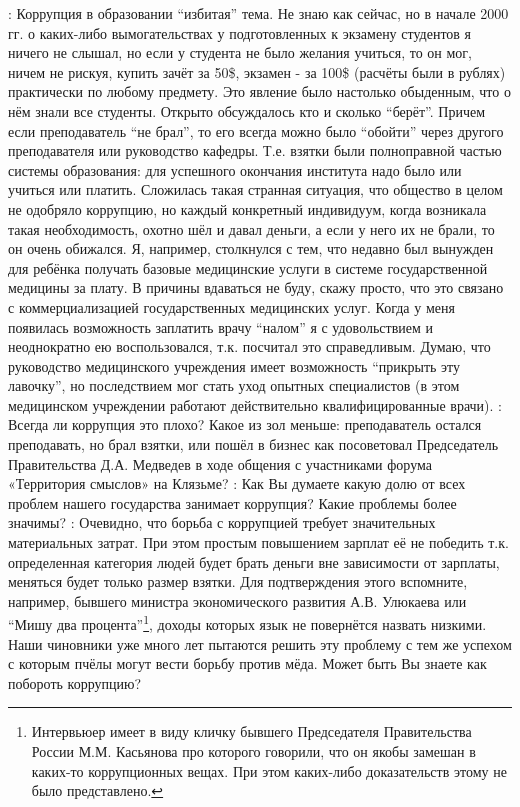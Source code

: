 \begin{drama}
	\maxspeaks: Коррупция в образовании “избитая” тема. Не знаю как сейчас, но в начале 2000 гг. о каких-либо вымогательствах у подготовленных к экзамену студентов я ничего не слышал, но если у студента не было желания учиться, то он мог, ничем не рискуя, купить зачёт за 50\$, экзамен - за 100\$ (расчёты были в рублях) практически по любому предмету. Это явление было настолько обыденным, что о нём знали все студенты. Открыто обсуждалось кто и сколько “берёт”. Причем если преподаватель “не брал”, то его всегда можно было “обойти” через другого преподавателя или руководство кафедры. Т.е. взятки были полноправной частью системы образования: для успешного окончания института надо было или учиться или платить. Сложилась такая странная ситуация, что общество в целом не одобряло коррупцию, но каждый конкретный индивидуум, когда возникала такая необходимость, охотно шёл и давал деньги, а если у него их не брали, то он очень обижался. 
Я, например, столкнулся с тем, что недавно был вынужден для ребёнка получать базовые медицинские услуги в системе государственной медицины за плату. В причины вдаваться не буду, скажу просто, что это связано с коммерциализацией государственных медицинских услуг. Когда у меня появилась возможность заплатить врачу “налом” я с удовольствием и неоднократно ею воспользовался, т.к. посчитал это справедливым. Думаю, что руководство медицинского учреждения имеет возможность “прикрыть эту лавочку”, но последствием мог стать уход опытных специалистов (в этом медицинском учреждении работают действительно квалифицированные врачи).
	\maxspeaks: Всегда ли коррупция это плохо? Какое из зол меньше: преподаватель остался преподавать, но брал взятки, или пошёл в бизнес как посоветовал Председатель Правительства Д.А. Медведев в ходе общения с участниками форума «Территория смыслов» на Клязьме?
	\maxspeaks: Как Вы думаете какую долю от всех проблем нашего государства занимает коррупция? Какие проблемы более значимы?
	\maxspeaks: Очевидно, что борьба с коррупцией требует значительных материальных затрат. При этом простым повышением зарплат её не победить т.к. определенная категория людей будет брать деньги вне зависимости от зарплаты, меняться будет только размер взятки. Для подтверждения этого вспомните, например, бывшего министра экономического развития А.В. Улюкаева или “Мишу два процента”\footnote{Интервьюер имеет в виду кличку бывшего Председателя Правительства России М.М. Касьянова про которого говорили, что он якобы замешан в каких-то коррупционных вещах. При этом каких-либо доказательств этому не было представлено.}, доходы которых язык не повернётся назвать низкими. Наши чиновники уже много лет пытаются решить эту проблему с тем же успехом с которым пчёлы могут вести борьбу против мёда. Может быть Вы знаете как побороть коррупцию? 

\end{drama}
